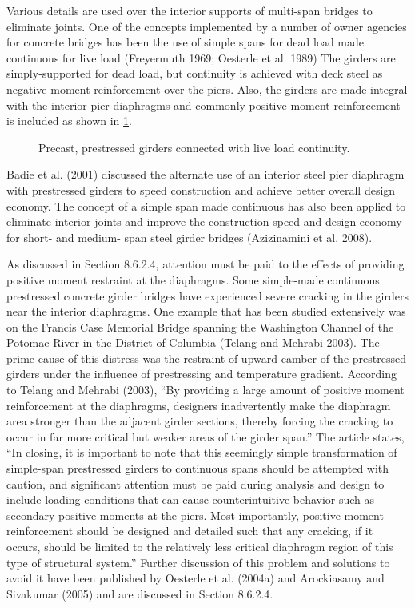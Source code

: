 Various details are used over the interior supports of multi-span bridges to eliminate joints. One of the concepts implemented by a number of owner agencies for concrete bridges has been the use of simple spans for dead load made continuous for live load (Freyermuth 1969; Oesterle et al. 1989) The girders are simply-supported for dead load, but continuity is achieved with deck steel as negative moment reinforcement over the piers. Also, the girders are made integral with the interior pier diaphragms and commonly positive moment reinforcement is included as shown in \cref{fig:continuity-live-load-connection}.

\begin{figure}
  \caption{Precast, prestressed girders connected with live load continuity.}
  \label{fig:continuity-live-load-connection}
\end{figure}

Badie et al. (2001) discussed the alternate use of an interior steel pier diaphragm with prestressed girders to speed
construction and achieve better overall design economy. The concept of a simple span made continuous has also been applied to eliminate interior joints and improve the construction speed and design economy for short- and medium-
span steel girder bridges (Azizinamini et al. 2008).

As discussed in Section 8.6.2.4, attention must be paid to the effects of providing positive moment restraint at the
diaphragms. Some simple-made continuous prestressed concrete girder bridges have experienced severe cracking in
the girders near the interior diaphragms. One example that has been studied extensively was on the Francis Case
Memorial Bridge spanning the Washington Channel of the Potomac River in the District of Columbia (Telang and
Mehrabi 2003). The prime cause of this distress was the restraint of upward camber of the prestressed girders under
the influence of prestressing and temperature gradient. According to Telang and Mehrabi (2003), “By providing a
large amount of positive moment reinforcement at the diaphragms, designers inadvertently make the diaphragm area
stronger than the adjacent girder sections, thereby forcing the cracking to occur in far more critical but weaker areas
of the girder span.” The article states, “In closing, it is important to note that this seemingly simple transformation of
simple-span prestressed girders to continuous spans should be attempted with caution, and significant attention must
be paid during analysis and design to include loading conditions that can cause counterintuitive behavior such as
secondary positive moments at the piers. Most importantly, positive moment reinforcement should be designed and
detailed such that any cracking, if it occurs, should be limited to the relatively less critical diaphragm region of this
type of structural system.” Further discussion of this problem and solutions to avoid it have been published by
Oesterle et al. (2004a) and Arockiasamy and Sivakumar (2005) and are discussed in Section 8.6.2.4.

